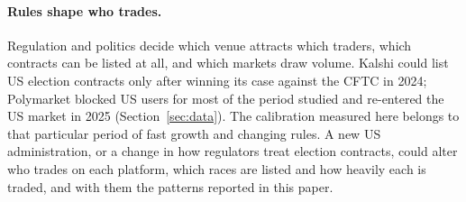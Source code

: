 \paragraph{Rules shape who trades.} Regulation and politics decide which venue attracts which traders, which contracts
can be listed at all, and which markets draw volume. Kalshi could list US election contracts only after winning its
case against the CFTC in 2024; Polymarket blocked US users for most of the period studied and re-entered the US market
in 2025 (Section~\ref{sec:data}). The calibration measured here belongs to that particular period of fast growth and
changing rules. A new US administration, or a change in how regulators treat election contracts, could alter who trades
on each platform, which races are listed and how heavily each is traded, and with them the patterns reported in this
paper.
